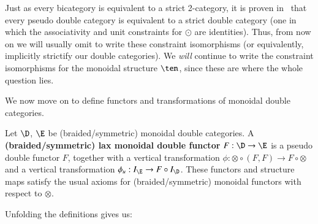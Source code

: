 \documentclass{amsart}
\begin{document}
Just as every bicategory is equivalent to a strict 2-category, it is
proven in~\cite{gp:double-limits} that every pseudo double category is
equivalent to a strict double category (one in which the associativity
and unit constraints for $\odot$ are identities).  Thus, from now on
we will usually omit to write these constraint isomorphisms (or
equivalently, implicitly strictify our double categories).  We
\emph{will} continue to write the constraint isomorphisms for the
monoidal structure $\ten$, since these are where the whole question
lies.

We now move on to define functors and transformations of monoidal double categories.

\begin{defn}\label{def:monfunc}
  Let $\D$, $\E$ be (braided/symmetric) monoidal double categories.  A {\bf (braided/symmetric) lax monoidal double functor} $F: \D \rightarrow \E$ is a pseudo double functor $F$, together with a vertical transformation $\phi : \otimes \circ (F,F) \rightarrow F \circ \otimes$ and
 a vertical transformation $\phi_u:I_{\E}\rightarrow F \circ I_{\D}$. These functors and structure maps satisfy the usual axioms for (braided/symmetric) monoidal functors with respect to $\otimes$.
\end{defn}

Unfolding the definitions gives us:
\end{document}
